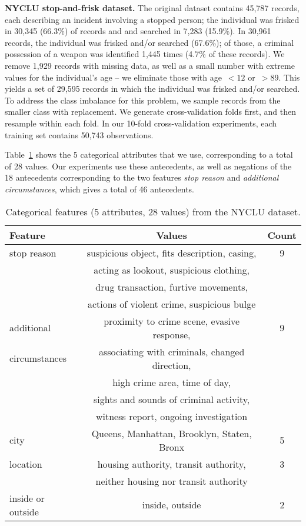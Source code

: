 \textbf{NYCLU stop-and-frisk dataset.} The original dataset contains 45,787 records,
each describing an incident involving a stopped person; the individual
was frisked in 30,345 (66.3\%) of records and and searched in 7,283 (15.9\%).
%
In 30,961 records, the individual was frisked and/or searched (67.6\%); of those,
a criminal possession of a weapon was identified 1,445 times (4.7\% of these records).
%
We remove 1,929 records with missing data, as well as a small number with extreme values
for the individual's age -- we eliminate those with age~${< 12}$ or~${>89}$.
%
This yields a set of 29,595 records in which the individual was frisked and/or searched.
%
To address the class imbalance for this problem, we sample records from the
smaller class with replacement.
%
We generate cross-validation folds first, and then resample within each fold.
%
In our 10-fold cross-validation experiments, each training set contains 50,743 observations.

Table~\ref{tab:frisk-data} shows the 5 categorical attributes that we use,
corresponding to a total of 28 values.
%
Our experiments use these antecedents,
as well as negations of the 18 antecedents corresponding to the two features
\emph{stop reason} and \emph{additional circumstances},
which gives a total of 46 antecedents.

\begin{table}[t!]
\centering
\begin{tabular}{l | c  c}
Feature & Values & Count \\
\hline
stop reason & suspicious object, fits description, casing, & 9 \\
& acting as lookout, suspicious clothing, & \\
& drug transaction, furtive movements, & \\
& actions of violent crime, suspicious bulge \\
\hline
additional & proximity to crime scene, evasive response,  & 9 \\
circumstances & associating with criminals, changed direction, & \\
& high crime area, time of day,  & \\
& sights and sounds of criminal activity, & \\
& witness report, ongoing investigation & \\
\hline
city & Queens,  Manhattan, Brooklyn, Staten, Bronx & 5 \\
\hline
location & housing authority, transit authority, & 3 \\
& neither housing nor transit authority & \\
\hline
inside or outside & inside, outside & 2 \\
\end{tabular}
\caption{Categorical features (5 attributes, 28 values) from the NYCLU dataset.}
\vspace{4mm}
\label{tab:frisk-data}
\end{table}

